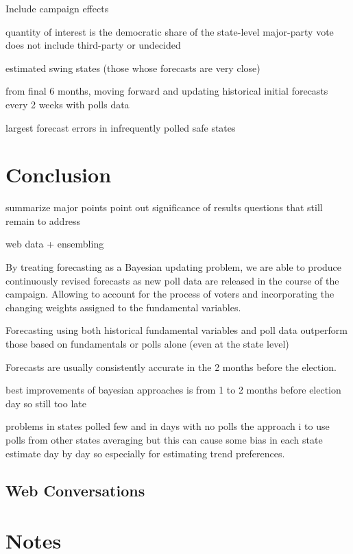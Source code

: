 \documentclass[
  12pt]{article}
\begin{document}
Include campaign effects

quantity of interest is the democratic share of the state-level
major-party vote does not include third-party or undecided

estimated swing states (those whose forecasts are very close)

from final 6 months, moving forward and updating historical initial
forecasts every 2 weeks with polls data

largest forecast errors in infrequently polled safe states

\hypertarget{sec-conc}{%
\section{Conclusion}\label{sec-conc}}

summarize major points point out significance of results questions that
still remain to address

web data + ensembling

By treating forecasting as a Bayesian updating problem, we are able to
produce continuously revised forecasts as new poll data are released in
the course of the campaign. Allowing to account for the process of
voters and incorporating the changing weights assigned to the
fundamental variables.

Forecasting using both historical fundamental variables and poll data
outperform those based on fundamentals or polls alone (even at the state
level)

Forecasts are usually consistently accurate in the 2 months before the
election.

best improvements of bayesian approaches is from 1 to 2 months before
election day so still too late

problems in states polled few and in days with no polls the approach i
to use polls from other states averaging but this can cause some bias in
each state estimate day by day so especially for estimating trend
preferences.

\hypertarget{web-conversations}{%
\subsection{Web Conversations}\label{web-conversations}}

\hypertarget{notes}{%
\section{Notes}\label{notes}}
\end{document}
